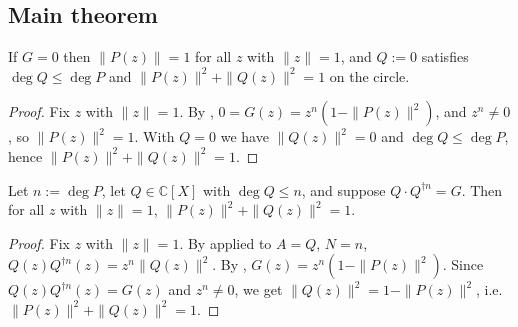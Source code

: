\subsection{Main theorem}

\begin{lemma}[The degenerate case $G = 0$]
    \label{lem:main-G-zero}
    \leanok
    If $G = 0$ then $\|P(z)\| = 1$ for all $z$ with $\|z\| = 1$, and $Q := 0$
    satisfies $\deg Q \le \deg P$ and $\|P(z)\|^2 + \|Q(z)\|^2 = 1$ on the circle.
\end{lemma}
\begin{proof}
    Fix $z$ with $\|z\| = 1$. By ,
    $0 = G(z) = z^{n}(1 - \|P(z)\|^2)$, and $z^{n} \neq 0$, so
    $\|P(z)\|^2 = 1$. With $Q = 0$ we have $\|Q(z)\|^2 = 0$ and $\deg Q \le \deg P$,
    hence $\|P(z)\|^2 + \|Q(z)\|^2 = 1$.
\end{proof}

\begin{lemma}
    \label{lem:factorization-to-norm}
    \leanok
    Let $n := \deg P$, let $Q \in \mathbb{C}[X]$ with $\deg Q \le n$, and suppose
    $Q\cdot Q^{\dagger n} = G$. Then for all $z$ with $\|z\| = 1$,
    $\|P(z)\|^2 + \|Q(z)\|^2 = 1$.
\end{lemma}
\begin{proof}
    Fix $z$ with $\|z\| = 1$. By  applied to $A = Q$,
    $N = n$, $Q(z)Q^{\dagger n}(z) = z^{n}\|Q(z)\|^2$. By ,
    $G(z) = z^{n}(1 - \|P(z)\|^2)$. Since $Q(z)Q^{\dagger n}(z) = G(z)$ and
    $z^{n} \neq 0$, we get $\|Q(z)\|^2 = 1 - \|P(z)\|^2$, i.e.
    $\|P(z)\|^2 + \|Q(z)\|^2 = 1$.
\end{proof}

